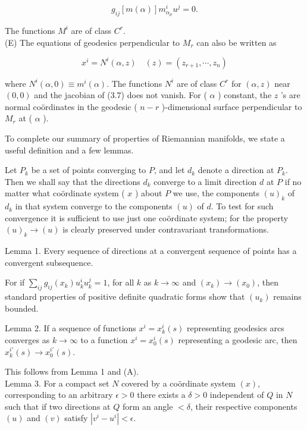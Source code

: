\documentclass[10pt]{article}
\begin{document}
\begin{equation*}
g_{i j}[m(\alpha)] m_{\alpha_{\mu}}^{i} u^{j}=0 . \tag{3.6}
\end{equation*}

The functions $M^{i}$ are of class $C^{r}$.\\
(E) The equations of geodesics perpendicular to $M_{r}$ can also be written as

\begin{equation*}
x^{i}=N^{i}(\alpha, z) \quad(z)=\left(z_{r+1}, \cdots, z_{n}\right) \tag{3.7}
\end{equation*}

where $N^{i}(\alpha, 0) \equiv m^{i}(\alpha)$. The functions $N^{i}$ are of class $C^{r}$ for $(\alpha, z)$ near $(0,0)$ and the jacobian of (3.7) does not vanish. For ( $\alpha$ ) constant, the $z$ 's are normal coördinates in the geodesic ( $n-r$ )-dimensional surface perpendicular to $M_{r}$ at ( $\alpha$ ).

To complete our summary of properties of Riemannian manifolds, we state a useful definition and a few lemmas.

Let $P_{k}$ be a set of points converging to $P$, and let $d_{k}$ denote a direction at $P_{k}$. Then we shall say that the directions $d_{k}$ converge to a limit direction $d$ at $P$ if no matter what coördinate system ( $x$ ) about $P$ we use, the components $(u)_{k}$ of $d_{k}$ in that system converge to the components $(u)$ of $d$. To test for such convergence it is sufficient to use just one coördinate system; for the property $(u)_{k} \rightarrow(u)$ is clearly preserved under contravariant transformations.

Lemma 1. Every sequence of directions at a convergent sequence of points has a convergent subsequence.

For if $\sum_{i j} g_{i j}\left(x_{k}\right) u_{k}^{i} u_{k}^{j}=1$, for all $k$ as $k \rightarrow \infty$ and $\left(x_{k}\right) \rightarrow\left(x_{0}\right)$, then standard properties of positive definite quadratic forms show that $\left(u_{k}\right)$ remains bounded.

Lemma 2. If a sequence of functions $x^{i}=x_{k}^{i}(s)$ representing geodesics arcs converges as $k \rightarrow \infty$ to a function $x^{i}=x_{0}^{i}(s)$ representing a geodesic arc, then $x_{k}^{i \prime}(s) \rightarrow x_{0}^{i \prime}(s)$.

This follows from Lemma 1 and (A).\\
Lemma 3. For a compact set $N$ covered by a coördinate system $(x)$, corresponding to an arbitrary $\epsilon>0$ there exists a $\delta>0$ independent of $Q$ in $N$ such that if two directions at $Q$ form an angle $<\delta$, their respective components $(u)$ and $(v)$ satisfy $\left|v^{i}-u^{i}\right|<\epsilon$.
\end{document}
